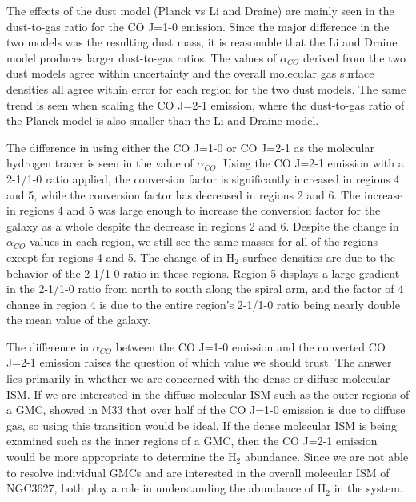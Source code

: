 The effects of the dust model (Planck vs Li and Draine) are mainly seen in the dust-to-gas ratio for the CO J=1-0 emission.  Since the major difference in the two models was the resulting dust mass, it is reasonable that the Li and Draine model produces larger dust-to-gas ratios.  The values of $\alpha_{CO}$ derived from the two dust models agree within uncertainty and the overall molecular gas surface densities all agree within error for each region for the two dust models.  The same trend is seen when scaling the CO J=2-1 emission, where the dust-to-gas ratio of the Planck model is also smaller than the Li and Draine model.  %
  
  The difference in using either the CO J=1-0 or CO J=2-1 as the molecular hydrogen tracer is seen in the value of $\alpha_{CO}$.  Using the CO J=2-1 emission with a 2-1/1-0 ratio applied, the conversion factor is significantly increased in regions 4 and 5, while the conversion factor has decreased in regions 2 and 6.  The increase in regions 4 and 5 was large enough to increase the conversion factor for the galaxy as a whole despite the decrease in regions 2 and 6.  Despite the change in $\alpha_{CO}$ values in each region, we still see the same masses for all of the regions except for regions 4 and 5.  The change of in H$_2$ surface densities are due to the behavior of the 2-1/1-0 ratio in these regions.  Region 5 displays a large gradient in the 2-1/1-0 ratio from north to south along the spiral arm, and the factor of 4 change in region 4 is due to the entire region's 2-1/1-0 ratio being nearly double the mean value of the galaxy. 
  
The difference in $\alpha_{CO}$ between the CO J=1-0 emission and the converted CO J=2-1 emission raises the question of which value we should trust.  The answer lies primarily in whether we are concerned with the dense or diffuse molecular ISM.  If we are interested in the diffuse molecular ISM such as the outer regions of a GMC, \cite{wilson1990} showed in M33 that over half of the CO J=1-0 emission is due to diffuse gas, so using this transition would be ideal.  If the dense molecular ISM is being examined such as the inner regions of a GMC, then the CO J=2-1 emission would be more appropriate to determine the H$_2$ abundance.  Since we are not able to resolve individual GMCs and are interested in the overall molecular ISM of NGC3627, both play a role in understanding the abundance of H$_2$ in the system.

